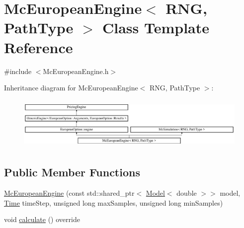 \hypertarget{class_mc_european_engine}{}\section{Mc\+European\+Engine$<$ R\+NG, Path\+Type $>$ Class Template Reference}
\label{class_mc_european_engine}


{\ttfamily \#include $<$Mc\+European\+Engine.\+h$>$}

Inheritance diagram for Mc\+European\+Engine$<$ R\+NG, Path\+Type $>$\+:\begin{figure}[H]
\begin{center}
\leavevmode
\includegraphics[height=2.586605cm]{class_mc_european_engine}
\end{center}
\end{figure}
\subsection*{Public Member Functions}
\begin{DoxyCompactItemize}
\item 
\hyperlink{class_mc_european_engine_aa571d66762d49d9bdb29b591a74e1ee0}{Mc\+European\+Engine} (const std\+::shared\+\_\+ptr$<$ \hyperlink{class_model}{Model}$<$ double $>$$>$ model, \hyperlink{_name_def_8h_ac2d3e0ba793497bcca555c7c2cf64ff3}{Time} time\+Step, unsigned long max\+Samples, unsigned long min\+Samples)
\item 
void \hyperlink{class_mc_european_engine_ade20e53724dc0a0b103b211ee61a7c67}{calculate} () override
\end{DoxyCompactItemize}
